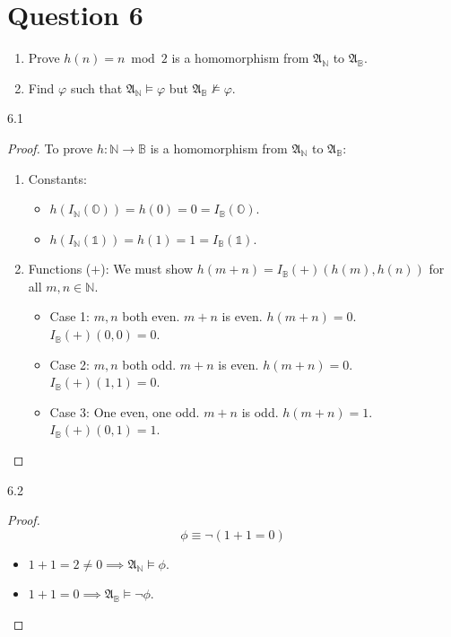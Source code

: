 \documentclass{article}
\begin{document}
\section*{Question 6}
\begin{enumerate}
    \item Prove $h(n) = n \bmod 2$ is a homomorphism from $\mathfrak{A}_\mathbb{N}$ to $\mathfrak{A}_\mathbb{B}$.
    \item Find $\varphi$ such that $\mathfrak{A}_\mathbb{N} \models \varphi$ but $\mathfrak{A}_\mathbb{B} \not\models \varphi$.
\end{enumerate}
6.1
\begin{proof}
    To prove $h: \mathbb{N} \to \mathbb{B}$ is a homomorphism from $\mathfrak{A}_{\mathbb{N}}$ to $\mathfrak{A}_{\mathbb{B}}$:
    \begin{enumerate}
        \item {Constants:} 
        \begin{itemize}
            \item $h(I_{\mathbb{N}}(\mathbb{O})) = h(0) = 0 = I_{\mathbb{B}}(\mathbb{O})$.
            \item $h(I_{\mathbb{N}}(\mathds{1})) = h(1) = 1 = I_{\mathbb{B}}(\mathds{1})$.
        \end{itemize}
        \item {Functions ($+$):} We must show $h(m + n) = I_{\mathbb{B}}(+)(h(m), h(n))$ for all $m, n \in \mathbb{N}$.
        \begin{itemize}
            \item Case 1: $m, n$ both even. $m+n$ is even. $h(m+n)=0$. $I_{\mathbb{B}}(+)(0, 0)=0$.
            \item Case 2: $m, n$ both odd. $m+n$ is even. $h(m+n)=0$. $I_{\mathbb{B}}(+)(1, 1)=0$.
            \item Case 3: One even, one odd. $m+n$ is odd. $h(m+n)=1$. $I_{\mathbb{B}}(+)(0, 1)=1$.
        \end{itemize}
    \end{enumerate}
    \end{proof}
    6.2
    \begin{proof}
    \[ \phi \equiv \neg (1 + 1 = 0) \]
    \begin{itemize}
        \item $1 + 1 = 2 \neq 0 \implies \mathfrak{A}_{\mathbb{N}} \models \phi$.
        \item $1 + 1 = 0 \implies \mathfrak{A}_{\mathbb{B}} \models \neg \phi$.
    \end{itemize}
    \end{proof}
\end{document}
